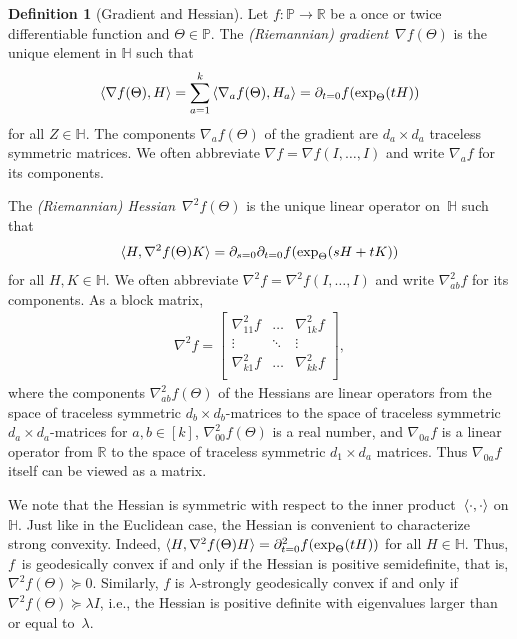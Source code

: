 \documentclass[aos]{imsart}
\theoremstyle{definition}
\newtheorem{definition}[theorem]{Definition}
\numberwithin{equation}{section}
\newcommand{\R}{{\mathbb{R}}}
\renewcommand{\P}{{\mathbb{P}}}
\renewcommand{\H}{{\mathbb{H}}}
\begin{document}
\begin{definition}[Gradient and Hessian]
Let $f\colon \P \to \R$ be a once or twice differentiable function and $\Theta \in \P$.
The \emph{(Riemannian) gradient}~$\nabla f(\Theta)$ is the unique element in $\H$ such that
\begin{align*}
  \braket{\nabla f(\Theta), H} = \sum_{a=1}^k \braket{\nabla_a f(\Theta), H_a} = \partial_{t=0} f(\exp_\Theta(tH))
\end{align*}
for all $Z\in \H$.
The components $\nabla_a f(\Theta)$ of the gradient are $d_a \times d_a$ traceless symmetric matrices.
We often abbreviate $\nabla f = \nabla f(I,\dots,I)$ and write $\nabla_a f$ for its components.

The \emph{(Riemannian) Hessian}~$\nabla^2 f(\Theta)$ is the unique linear operator on~$\H$ such that
\begin{align*}
  \braket{H, \nabla^2 f(\Theta) K}
= \partial_{s=0} \partial_{t=0} f(\exp_{\Theta}(sH + tK))
\end{align*}
for all $H,K \in \H$.
We often abbreviate $\nabla^2 f = \nabla^2 f(I,\dots,I)$ and write $\nabla^2_{ab}f$ for its components.
As a block matrix,
\begin{align*}
  \nabla^2 f = \begin{bmatrix}
  \nabla_{11}^2 f & \dots & \nabla_{1k}^2 f \\
  \vdots & \ddots & \vdots \\
  \nabla_{k1}^2 f & \dots & \nabla_{kk}^2 f \\
  \end{bmatrix},
\end{align*}
where the components $\nabla_{ab}^2f(\Theta)$ of the Hessians are linear operators from the space of traceless symmetric $d_b\times d_b$-matrices to the space of traceless symmetric $d_a \times d_a$-matrices for $a, b \in [k]$, $\nabla^2_{00} f(\Theta)$ is a real number, and $\nabla_{0a}f$ is a linear operator from $\R$ to the space of traceless symmetric $d_1\times d_a$ matrices. Thus $\nabla_{0a}f$ itself can be viewed as a matrix.
\end{definition}

We note that the Hessian is symmetric with respect to the inner product~$\braket{\cdot,\cdot}$ on $\H$.
Just like in the Euclidean case, the Hessian is convenient to characterize strong convexity.
Indeed, $\braket{H, \nabla^2 f(\Theta) H} = \partial^2_{t=0} f(\exp_{\Theta}(tH))$ for all $H\in \H$.
Thus, $f$~is geodesically convex if and only if the Hessian is positive semidefinite, that is, $\nabla^2 f(\Theta) \succeq 0$. %
Similarly, $f$ is $\lambda$-strongly geodesically convex if and only if~$\nabla^2 f(\Theta) \succeq \lambda I$, i.e., the Hessian is positive definite with eigenvalues larger than or equal to~$\lambda$.
\end{document}
